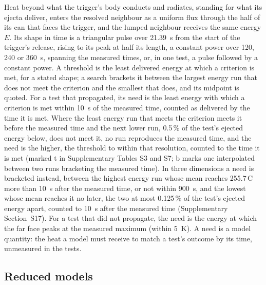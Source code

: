 \documentclass[preprint,12pt]{elsarticle}
\newcommand{\degC}{\,\textdegree C}
\begin{document}
Heat beyond what the trigger's body conducts and radiates, standing for what its ejecta deliver, enters the resolved neighbour as a uniform flux through the half of its can that faces the trigger, and the lumped neighbour receives the same energy $E$. Its shape in time is a triangular pulse over 21.39~s from the start of the trigger's release, rising to its peak at half its length, a constant power over 120, 240 or 360~s, spanning the measured times, or, in one test, a pulse followed by a constant power. A threshold is the least delivered energy at which a criterion is met, for a stated shape; a search brackets it between the largest energy run that does not meet the criterion and the smallest that does, and its midpoint is quoted. For a test that propagated, its need is the least energy with which a criterion is met within 10~s of the measured time, counted as delivered by the time it is met. Where the least energy run that meets the criterion meets it before the measured time and the next lower run, 0.5\,\% of the test's ejected energy below, does not meet it, no run reproduces the measured time, and the need is the higher, the threshold to within that resolution, counted to the time it is met (marked t in Supplementary Tables S3 and S7; b marks one interpolated between two runs bracketing the measured time). In three dimensions a need is bracketed instead, between the highest energy run whose mean reaches 255.7\degC{} more than 10~s after the measured time, or not within 900~s, and the lowest whose mean reaches it no later, the two at most 0.125\,\% of the test's ejected energy apart, counted to 10~s after the measured time (Supplementary Section~S17). For a test that did not propagate, the need is the energy at which the far face peaks at the measured maximum (within 5~K). A need is a model quantity: the heat a model must receive to match a test's outcome by its time, unmeasured in the tests.

\subsection{Reduced models}
\label{sec:reduced}
\end{document}
